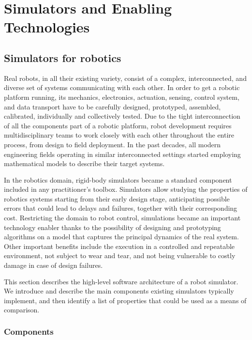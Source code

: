 \chapter{Simulators and Enabling Technologies}
\label{ch:introduction}

\section{Simulators for robotics}

Real robots, in all their existing variety, consist of a complex, interconnected, and diverse set of systems communicating with each other.
In order to get a robotic platform running, its mechanics, electronics, actuation, sensing, control system, and data transport have to be carefully designed, prototyped, assembled, calibrated, individually and collectively tested.
Due to the tight interconnection of all the components part of a robotic platform, robot development requires multidisciplinary teams to work closely with each other throughout the entire process, from design to field deployment.
In the past decades, all modern engineering fields operating in similar interconnected settings started employing mathematical models to describe their target systems.

In the robotics domain, rigid-body simulators became a standard component included in any practitioner's toolbox.
Simulators allow studying the properties of robotics systems starting from their early design stage, anticipating possible errors that could lead to delays and failures, together with their corresponding cost.
Restricting the domain to robot control, simulations became an important technology enabler thanks to the possibility of designing and prototyping algorithms on a model that captures the principal dynamics of the real system.
Other important benefits include the execution in a controlled and repeatable environment, not subject to wear and tear, and not being vulnerable to costly damage in case of design failures.

This section describes the high-level software architecture of a robot simulator.
We introduce and describe the main components existing simulators typically implement, and then identify a list of properties that could be used as a means of comparison.

\subsection{Components}


